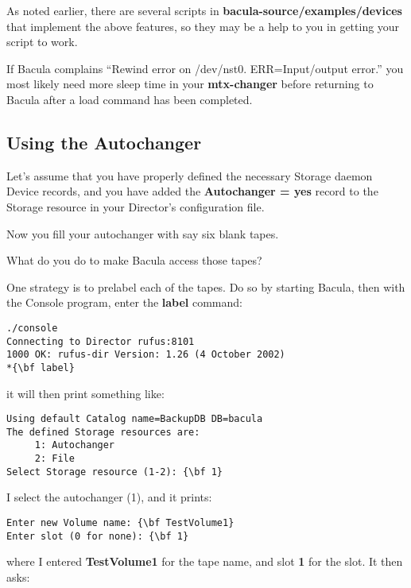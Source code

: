 As noted earlier, there are several scripts in {\bf
\lt{}bacula-source\gt{}/examples/devices} that implement the above features,
so they may be a help to you in getting your script to work. 

If Bacula complains ``Rewind error on /dev/nst0. ERR=Input/output error.'' you
most likely need more sleep time in your {\bf mtx-changer} before returning to
Bacula after a load command has been completed.

\label{using}

\subsection*{Using the Autochanger}

Let's assume that you have properly defined the necessary Storage daemon
Device records, and you have added the {\bf Autochanger = yes} record to the
Storage resource in your Director's configuration file. 

Now you fill your autochanger with say six blank tapes. 

What do you do to make Bacula access those tapes? 

One strategy is to prelabel each of the tapes. Do so by starting Bacula, then
with the Console program, enter the {\bf label} command: 

\footnotesize
\begin{verbatim}
./console
Connecting to Director rufus:8101
1000 OK: rufus-dir Version: 1.26 (4 October 2002)
*{\bf label}
\end{verbatim}
\normalsize

it will then print something like: 

\footnotesize
\begin{verbatim}
Using default Catalog name=BackupDB DB=bacula
The defined Storage resources are:
     1: Autochanger
     2: File
Select Storage resource (1-2): {\bf 1}
\end{verbatim}
\normalsize

I select the autochanger (1), and it prints: 

\footnotesize
\begin{verbatim}
Enter new Volume name: {\bf TestVolume1}
Enter slot (0 for none): {\bf 1}
\end{verbatim}
\normalsize

where I entered {\bf TestVolume1} for the tape name, and slot {\bf 1} for the
slot. It then asks: 

